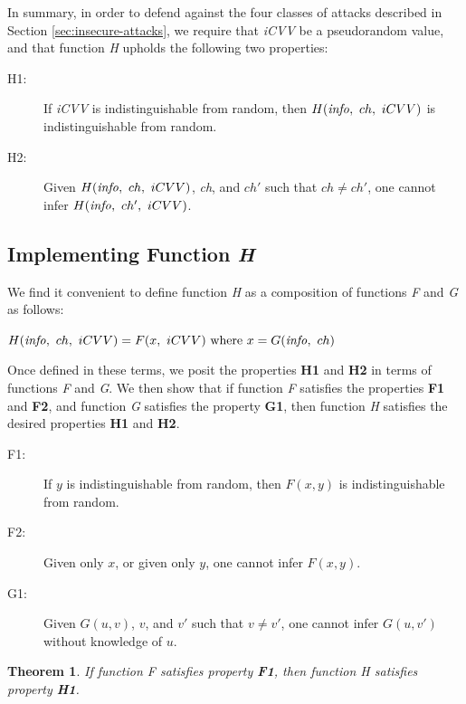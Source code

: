 In summary, in order to defend against the four classes of attacks described in Section \ref{sec:insecure-attacks},
	we require that \emph{iCVV} be a pseudorandom value, and that function \emph{H} upholds the following two properties:

\begin{description}
\item[H1:] If \emph{iCVV} is indistinguishable from random, then $H(\textrm{\emph{info}},~ ch,~ iCVV)$ is indistinguishable from random.
\item[H2:] Given $H(\textrm{\emph{info}},~ ch,~ iCVV)$, \emph{ch}, and $ch'$ such that $ch \neq ch'$, one cannot infer $H(\textrm{\emph{info}},~ ch',~ iCVV)$.
\end{description}









\subsection{Implementing Function \emph{H}}

We find it convenient to define function \emph{H} as a composition of functions \emph{F} and \emph{G} as follows:

$H(\textrm{\emph{info}},~ ch,~ iCVV) = F(x,~ iCVV) \textrm{ where } x = G(\textrm{\emph{info}},~ ch)$

Once defined in these terms, we posit the properties \textbf{H1} and \textbf{H2} in terms of functions \emph{F} and \emph{G}.
We then show that if function \emph{F} satisfies the properties \textbf{F1} and \textbf{F2}, and function \emph{G} satisfies the property \textbf{G1},
then function \emph{H} satisfies the desired properties \textbf{H1} and \textbf{H2}.

\begin{description}
\item[F1:] If $y$ is indistinguishable from random, then $F(x, y)$ is indistinguishable from random.
\item[F2:] Given only $x$, or given only $y$, one cannot infer $F(x, y)$.
\item[G1:] Given $G(u, v)$, $v$, and $v'$ such that $v \neq v'$, one cannot infer $G(u, v')$ without knowledge of $u$.
\end{description}

\newtheorem{theorem}{Theorem}

\begin{theorem}
If function \emph{F} satisfies property \textbf{F1}, then function \emph{H} satisfies property \textbf{H1}.
\end{theorem}

